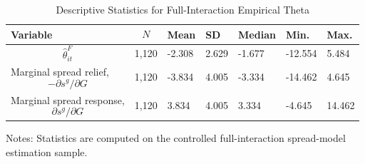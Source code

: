 \begin{table}[H]\centering
\begin{threeparttable}
\caption{Descriptive Statistics for Full-Interaction Empirical Theta}
\label{tab:theta_descriptive_stats}
\scriptsize
\begin{tabularx}{\textwidth}{lYYYYYY}
\toprule
Variable & $$N$$ & Mean & SD & Median & Min. & Max. \\
\midrule
$$\widehat{\theta}^{F}_{it}$$ & 1,120 & -2.308 & 2.629 & -1.677 & -12.554 & 5.484 \\
Marginal spread relief, $$-\partial s^g/\partial G$$ & 1,120 & -3.834 & 4.005 & -3.334 & -14.462 & 4.645 \\
Marginal spread response, $$\partial s^g/\partial G$$ & 1,120 & 3.834 & 4.005 & 3.334 & -4.645 & 14.462 \\
\bottomrule
\end{tabularx}
\begin{tablenotes}[flushleft]\footnotesize
\item Notes: Statistics are computed on the controlled full-interaction spread-model estimation sample.
\end{tablenotes}
\end{threeparttable}
\end{table}
